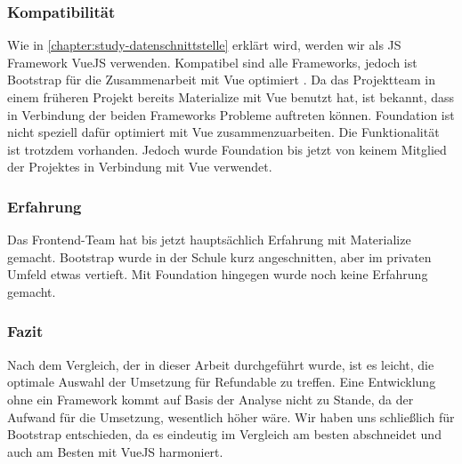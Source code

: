 \subsubsection{Kompatibilität}
\label{chapter:study-frontend-vergleich-kompatibilität}
Wie in \autoref{chapter:study-datenschnittstelle} erklärt wird, werden wir als JS Framework VueJS verwenden. Kompatibel sind alle Frameworks, jedoch ist Bootstrap für die Zusammenarbeit mit Vue optimiert \cite{bootstrap-docu}. Da das Projektteam in einem früheren Projekt bereits Materialize mit Vue benutzt hat, ist bekannt, dass in Verbindung der beiden Frameworks Probleme auftreten können. Foundation ist nicht speziell dafür optimiert mit Vue zusammenzuarbeiten. Die Funktionalität ist trotzdem vorhanden. Jedoch wurde Foundation bis jetzt von keinem Mitglied der Projektes in Verbindung mit Vue verwendet.

\subsubsection{Erfahrung}
\label{chapter:study-frontend-vergleich-erfahrung}
Das Frontend-Team hat bis jetzt hauptsächlich Erfahrung mit Materialize gemacht. Bootstrap wurde in der Schule kurz angeschnitten, aber im privaten Umfeld etwas vertieft. Mit Foundation hingegen wurde noch keine Erfahrung gemacht.

\subsubsection{Fazit}
\label{chapter:study-frontend-vergleich-fazit}
Nach dem Vergleich, der in dieser Arbeit durchgeführt wurde, ist es leicht, die optimale Auswahl der Umsetzung für Refundable zu treffen. Eine Entwicklung ohne ein Framework kommt auf Basis der Analyse nicht zu Stande, da der Aufwand für die Umsetzung, wesentlich höher wäre. Wir haben uns schließlich für Bootstrap entschieden, da es eindeutig im Vergleich am besten abschneidet und auch am Besten mit VueJS harmoniert.

